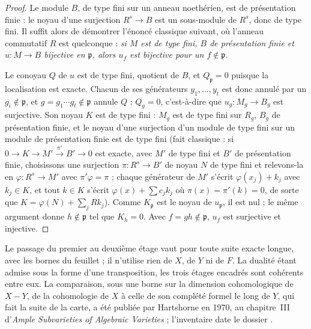 \begin{proof}
Le module $B$, de type fini sur un anneau noethérien, est de présentation finie : le noyau d'une surjection $R^s \to B$ est un sous-module de $R^s$, donc de type fini. Il suffit alors de démontrer l'énoncé classique suivant, où l'anneau commutatif $R$ est quelconque : \emph{si $M$ est de type fini, $B$ de présentation finie et $u : M \to B$ bijective en $\mathfrak p$, alors $u_f$ est bijective pour un $f \notin \mathfrak p$.}

Le conoyau $Q$ de $u$ est de type fini, quotient de $B$, et $Q_{\mathfrak p} = 0$ puisque la localisation est exacte. Chacun de ses générateurs $y_1, \dots, y_t$ est donc annulé par un $g_i \notin \mathfrak p$, et $g = g_1 \cdots g_t \notin \mathfrak p$ annule $Q$ : $Q_g = 0$, c'est-à-dire que $u_g : M_g \to B_g$ est surjective. Son noyau $K$ est de type fini : $M_g$ est de type fini sur $R_g$, $B_g$ de présentation finie, et le noyau d'une surjection d'un module de type fini sur un module de présentation finie est de type fini (fait classique : si $0 \to K \to M' \xrightarrow{\ \pi'\ } B' \to 0$ est exacte, avec $M'$ de type fini et $B'$ de présentation finie, choisissons une surjection $\pi : R^s \to B'$ de noyau $N$ de type fini et relevons-la en $\varphi : R^s \to M'$ avec $\pi' \varphi = \pi$ ; chaque générateur de $M'$ s'écrit $\varphi(x_j) + k_j$ avec $k_j \in K$, et tout $k \in K$ s'écrit $\varphi(x) + \sum c_j k_j$ où $\pi(x) = \pi'(k) = 0$, de sorte que $K = \varphi(N) + \sum_j R k_j$). Comme $K_{\mathfrak p}$ est le noyau de $u_{\mathfrak p}$, il est nul ; le même argument donne $h \notin \mathfrak p$ tel que $K_h = 0$. Avec $f = gh \notin \mathfrak p$, $u_f$ est surjective et injective.
\end{proof}

\begin{remarque}
Le passage du premier au deuxième étage vaut pour toute suite exacte longue, avec les bornes du feuillet ; il n'utilise rien de $X$, de $Y$ ni de $F$. La dualité étant admise sous la forme d'une transposition, les trois étages encadrés sont cohérents entre eux. La comparaison, sous une borne sur la dimension cohomologique de $X - Y$, de la cohomologie de $X$ à celle de son complété formel le long de $Y$, qui fait la suite de la carte, a été publiée par Hartshorne en 1970, au chapitre~III d'\emph{Ample Subvarieties of Algebraic Varieties} \cite{hartshorne1970} ; l'inventaire date le dossier \q{[avant 1970]}.
\end{remarque}


